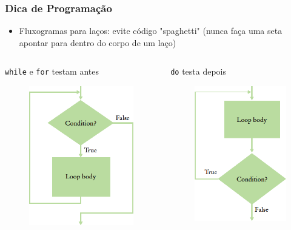 \documentclass[xcolor={dvipsnames,table},aspectratio=169]{beamer}
\begin{document}
\begin{frame}\frametitle{Dica de Programação}
\begin{itemize}
	\item Fluxogramas para laços: evite código "spaghetti" (nunca faça uma seta apontar para dentro do corpo de um laço)
\end{itemize}
\begin{columns}[T]
	\begin{column}{0.5\linewidth}
\begin{center}
\texttt{while} e \texttt{for} testam antes
\begin{figure}[h]
	\includegraphics[height=0.4\paperheight,center]{pucrs-ep-fprog-unidade_04-lacos-laminas-fluxograma_teste_antes.png}
\end{figure}
\end{center}
	\end{column}
	\begin{column}{0.5\linewidth}
\begin{center}
\texttt{do} testa depois
\begin{figure}[h]
	\includegraphics[height=0.4\paperheight,center]{pucrs-ep-fprog-unidade_04-lacos-laminas-fluxograma_teste_depois.png}

\end{figure}
\end{center}
\end{column}
\end{columns}
\end{frame}
\end{document}
